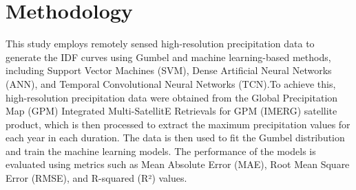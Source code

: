 \section{Methodology}

This study employs remotely sensed high-resolution precipitation data to generate the IDF curves using Gumbel and machine learning-based methods, including Support Vector Machines (SVM), Dense Artificial Neural Networks (ANN), and Temporal Convolutional Neural Networks (TCN).To achieve this, high-resolution precipitation data were obtained from the Global Precipitation Map (GPM) Integrated Multi-SatellitE Retrievals for GPM (IMERG) satellite product, which is then processed to extract the maximum precipitation values for each year in each duration. The data is then used to fit the Gumbel distribution and train the machine learning models. The performance of the models is evaluated using metrics such as Mean Absolute Error (MAE), Root Mean Square Error (RMSE), and R-squared (R²) values.




